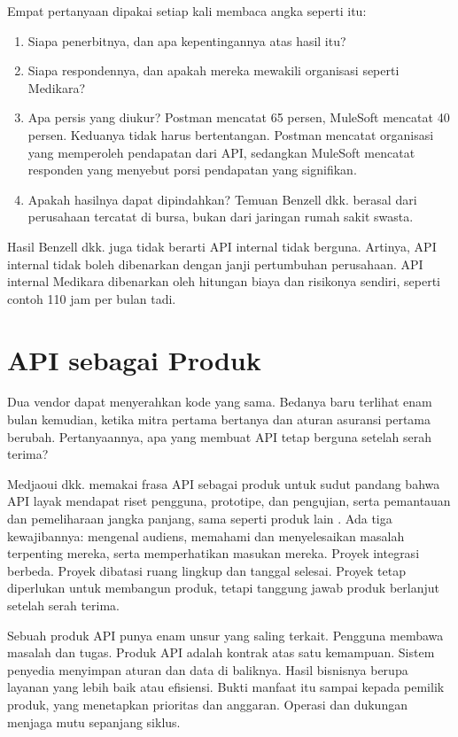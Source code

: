 Empat pertanyaan dipakai setiap kali membaca angka seperti itu:
\begin{enumerate}
  \item Siapa penerbitnya, dan apa kepentingannya atas hasil itu?
  \item Siapa respondennya, dan apakah mereka mewakili organisasi seperti Medikara?
  \item Apa persis yang diukur? Postman mencatat 65 persen, MuleSoft mencatat 40 persen. Keduanya tidak
        harus bertentangan. Postman mencatat organisasi yang memperoleh pendapatan dari API, sedangkan
        MuleSoft mencatat responden yang menyebut porsi pendapatan yang signifikan.
  \item Apakah hasilnya dapat dipindahkan? Temuan Benzell dkk. berasal dari perusahaan tercatat di bursa,
        bukan dari jaringan rumah sakit swasta.
\end{enumerate}

Hasil Benzell dkk. juga tidak berarti API internal tidak berguna. Artinya, API internal tidak boleh
dibenarkan dengan janji pertumbuhan perusahaan. API internal Medikara dibenarkan oleh hitungan biaya
dan risikonya sendiri, seperti contoh 110 jam per bulan tadi.

\section{API sebagai Produk}

Dua vendor dapat menyerahkan kode yang sama. Bedanya baru terlihat enam bulan kemudian, ketika mitra
pertama bertanya dan aturan asuransi pertama berubah. Pertanyaannya, apa yang membuat API tetap
berguna setelah serah terima?

Medjaoui dkk. memakai frasa API sebagai produk untuk sudut pandang bahwa API layak mendapat riset
pengguna, prototipe, dan pengujian, serta pemantauan dan pemeliharaan jangka panjang, sama seperti
produk lain \cite{medjaoui2021continuous}. Ada tiga kewajibannya: mengenal audiens, memahami dan
menyelesaikan masalah terpenting mereka, serta memperhatikan masukan mereka. Proyek integrasi berbeda.
Proyek dibatasi ruang lingkup dan tanggal selesai. Proyek tetap diperlukan untuk membangun produk,
tetapi tanggung jawab produk berlanjut setelah serah terima.

Sebuah produk API punya enam unsur yang saling terkait. Pengguna membawa masalah dan tugas. Produk API
adalah kontrak atas satu kemampuan. Sistem penyedia menyimpan aturan dan data di baliknya. Hasil
bisnisnya berupa layanan yang lebih baik atau efisiensi. Bukti manfaat itu sampai kepada pemilik
produk, yang menetapkan prioritas dan anggaran. Operasi dan dukungan menjaga mutu sepanjang siklus.

